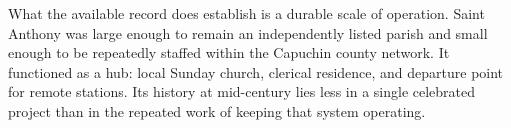 What the available record does establish is a durable scale of operation. Saint Anthony was large enough to remain an independently listed parish and small enough to be repeatedly staffed within the Capuchin county network. It functioned as a hub: local Sunday church, clerical residence, and departure point for remote stations. Its history at mid-century lies less in a single celebrated project than in the repeated work of keeping that system operating.

